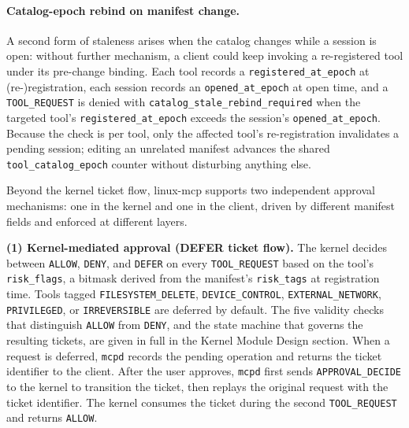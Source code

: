 \paragraph{Catalog-epoch rebind on manifest change.}
A second form of staleness arises when the catalog changes while a session is open: without further mechanism, a client could keep invoking a re-registered tool under its pre-change binding.
Each tool records a \texttt{registered\_\allowbreak at\_\allowbreak epoch} at (re-)registration, each session records an \texttt{opened\_\allowbreak at\_\allowbreak epoch} at open time, and a \texttt{TOOL\_\allowbreak REQUEST} is denied with \texttt{catalog\_\allowbreak stale\_\allowbreak rebind\_\allowbreak required} when the targeted tool's \texttt{registered\_\allowbreak at\_\allowbreak epoch} exceeds the session's \texttt{opened\_\allowbreak at\_\allowbreak epoch}.
Because the check is per tool, only the affected tool's re-registration invalidates a pending session; editing an unrelated manifest advances the shared \texttt{tool\_\allowbreak catalog\_\allowbreak epoch} counter without disturbing anything else.

Beyond the kernel ticket flow, linux-mcp supports two independent approval mechanisms: one in the kernel and one in the client, driven by different manifest fields and enforced at different layers.

\textbf{(1) Kernel-mediated approval (DEFER ticket flow).}
The kernel decides between \texttt{ALLOW}, \texttt{DENY}, and \texttt{DEFER} on every \texttt{TOOL\_\allowbreak REQUEST} based on the tool's \texttt{risk\_\allowbreak flags}, a bitmask derived from the manifest's \texttt{risk\_\allowbreak tags} at registration time.
Tools tagged \texttt{FILESYSTEM\_\allowbreak DELETE}, \texttt{DEVICE\_\allowbreak CONTROL}, \texttt{EXTERNAL\_\allowbreak NETWORK}, \texttt{PRIVILEGED}, or \texttt{IRREVERSIBLE} are deferred by default.
The five validity checks that distinguish \texttt{ALLOW} from \texttt{DENY}, and the state machine that governs the resulting tickets, are given in full in the Kernel Module Design section.
When a request is deferred, \texttt{mcpd} records the pending operation and returns the ticket identifier to the client.
After the user approves, \texttt{mcpd} first sends \texttt{APPROVAL\_\allowbreak DECIDE} to the kernel to transition the ticket, then replays the original request with the ticket identifier.
The kernel consumes the ticket during the second \texttt{TOOL\_\allowbreak REQUEST} and returns \texttt{ALLOW}.

